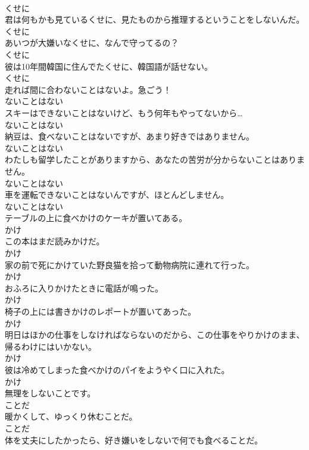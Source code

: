 \documentclass[8pt]{extreport}
\begin{document}
\begin{CJK}{UTF8}{min}
\\	くせに
\\	君は何もかも見ているくせに、見たものから推理するということをしないんだ。	
\\	くせに
\\	あいつが大嫌いなくせに、なんで守ってるの？	
\\	くせに
\\	彼は10年間韓国に住んでたくせに、韓国語が話せない。	
\\	くせに
\\	走れば間に合わないことはないよ。急ごう！	
\\	ないことはない
\\	スキーはできないことはないけど、もう何年もやってないから…	
\\	ないことはない
\\	納豆は、食べないことはないですが、あまり好きではありません。	
\\	ないことはない
\\	わたしも留学したことがありますから、あなたの苦労が分からないことはありません。	
\\	ないことはない
\\	車を運転できないことはないんですが、ほとんどしません。	
\\	ないことはない
\\	テーブルの上に食べかけのケーキが置いてある。	
\\	かけ
\\	この本はまだ読みかけだ。	
\\	かけ
\\	家の前で死にかけていた野良猫を拾って動物病院に連れて行った。	
\\	かけ
\\	おふろに入りかけたときに電話が鳴った。	
\\	かけ
\\	椅子の上には書きかけのレポートが置いてあった。	
\\	かけ
\\	明日はほかの仕事をしなければならないのだから、この仕事をやりかけのまま、帰るわけにはいかない。	
\\	かけ
\\	彼は冷めてしまった食べかけのパイをようやく口に入れた。	
\\	かけ
\\	無理をしないことです。	
\\	ことだ
\\	暖かくして、ゆっくり休むことだ。	
\\	ことだ
\\	体を丈夫にしたかったら、好き嫌いをしないで何でも食べることだ。	

\end{CJK}
\end{document}
